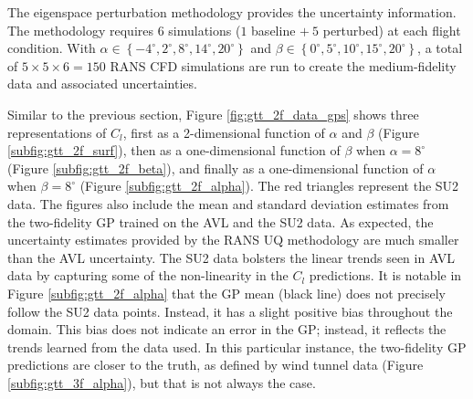 The eigenspace perturbation methodology provides the uncertainty information.
The methodology requires $6$ simulations ($1$ baseline $+~5$ perturbed) at each flight condition. 
With $\alpha \in \left \{ -4^\circ,2^\circ,8^\circ,14^\circ,20^\circ \right \}$ and $\beta \in \left \{ 0^\circ,5^\circ,10^\circ,15^\circ,20^\circ \right \}$, a total of $5\times5\times6 = 150$ RANS CFD simulations are run to create the medium-fidelity data and associated uncertainties. 

Similar to the previous section, Figure \ref{fig:gtt_2f_data_gps} shows three representations of $C_l$, first as a 2-dimensional function of $\alpha$ and $\beta$ (Figure \ref{subfig:gtt_2f_surf}), then as a one-dimensional function of $\beta$ when $\alpha=8^\circ$ (Figure \ref{subfig:gtt_2f_beta}), and finally as a one-dimensional function of $\alpha$ when $\beta = 8^\circ$ (Figure \ref{subfig:gtt_2f_alpha}).
The red triangles represent the SU2 data. 
The figures also include the mean and standard deviation estimates from the two-fidelity GP trained on the AVL and the SU2 data.
As expected, the uncertainty estimates provided by the RANS UQ methodology are much smaller than the AVL uncertainty. 
The SU2 data bolsters the linear trends seen in AVL data by capturing some of the non-linearity in the $C_l$ predictions. 
It is notable in Figure \ref{subfig:gtt_2f_alpha} that the GP mean (black line) does not precisely follow the SU2 data points.
Instead, it has a slight positive bias throughout the domain.
This bias does not indicate an error in the GP; instead, it reflects the trends learned from the data used.
In this particular instance, the two-fidelity GP predictions are closer to the truth, as defined by wind tunnel data (Figure \ref{subfig:gtt_3f_alpha}), but that is not always the case.

